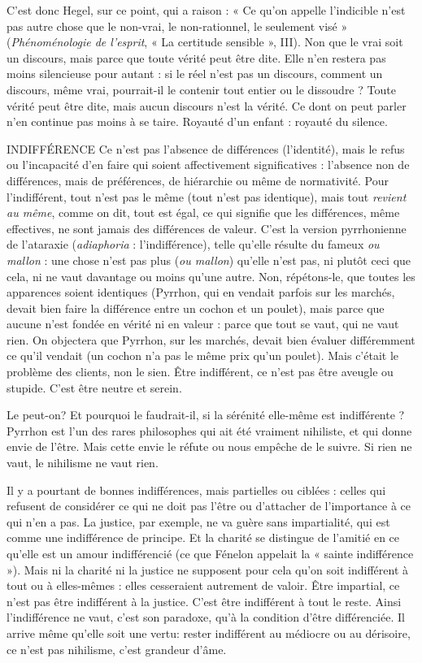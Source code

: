 C’est donc Hegel, sur ce point, qui a raison : « Ce qu’on appelle l’indicible
n’est pas autre chose que le non-vrai, le non-rationnel, le seulement visé »
({\it Phénoménologie de l'esprit}, « La certitude sensible », III). Non que le vrai soit un
discours, mais parce que toute vérité peut être dite. Elle n’en restera pas moins
silencieuse pour autant : si le réel n’est pas un discours, comment un discours,
même vrai, pourrait-il le contenir tout entier ou le dissoudre ? Toute vérité
peut être dite, mais aucun discours n’est la vérité. Ce dont on peut parler n’en
continue pas moins à se taire. Royauté d’un enfant : royauté du silence.

INDIFFÉRENCE Ce n’est pas l’absence de différences (l'identité), mais le
refus ou l'incapacité d’en faire qui soient affectivement
significatives : l'absence non de différences, mais de préférences, de hiérarchie
ou même de normativité. Pour l’indifférent, tout n’est pas le même (tout n’est
pas identique), mais tout {\it revient au même}, comme on dit, tout est égal, ce qui
signifie que les différences, même effectives, ne sont jamais des différences de
valeur. C’est la version pyrrhonienne de l’ataraxie ({\it adiaphoria} : l'indifférence),
telle qu’elle résulte du fameux {\it ou mallon} : une chose n’est pas plus ({\it ou mallon})
qu’elle n’est pas, ni plutôt ceci que cela, ni ne vaut davantage ou moins qu’une
autre. Non, répétons-le, que toutes les apparences soient identiques (Pyrrhon,
qui en vendait parfois sur les marchés, devait bien faire la différence entre un
cochon et un poulet), mais parce que aucune n’est fondée en vérité ni en valeur :
parce que tout se vaut, qui ne vaut rien. On objectera que Pyrrhon, sur les marchés,
devait bien évaluer différemment ce qu’il vendait (un cochon n’a pas le
même prix qu’un poulet). Mais c'était le problème des clients, non le sien. Être
indifférent, ce n’est pas être aveugle ou stupide. C’est être neutre et serein.

Le peut-on? Et pourquoi le faudrait-il, si la sérénité elle-même est
indifférente ? Pyrrhon est l’un des rares philosophes qui ait été vraiment nihiliste,
et qui donne envie de l’être. Mais cette envie le réfute ou nous empêche
de le suivre. Si rien ne vaut, le nihilisme ne vaut rien.

Il y a pourtant de bonnes indifférences, mais partielles ou ciblées : celles qui
refusent de considérer ce qui ne doit pas l’être ou d’attacher de l'importance à
ce qui n’en a pas. La justice, par exemple, ne va guère sans impartialité, qui est
comme une indifférence de principe. Et la charité se distingue de l’amitié en ce
qu’elle est un amour indifférencié (ce que Fénelon appelait la « sainte
indifférence »). Mais ni la charité ni la justice ne supposent pour cela qu’on soit
indifférent à tout ou à elles-mêmes : elles cesseraient autrement de valoir. Être
impartial, ce n’est pas être indifférent à la justice. C’est être indifférent à tout le
reste. Ainsi l’indifférence ne vaut, c’est son paradoxe, qu’à la condition d’être
différenciée. Il arrive même qu’elle soit une vertu: rester indifférent au
médiocre ou au dérisoire, ce n’est pas nihilisme, c’est grandeur d’âme.

